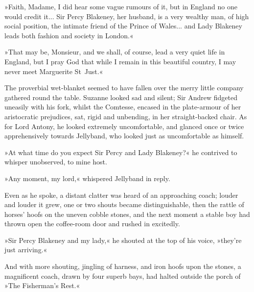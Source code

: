 »Faith, Madame, I did hear some vague rumours of it, but in England no one would credit it... Sir Percy Blakeney, her husband, is a very wealthy man, of high social position, the intimate friend of the Prince of Wales... and Lady Blakeney leads both fashion and society in London.«

»That may be, Monsieur, and we shall, of course, lead a very quiet life in England, but I pray God that while I remain in this beautiful country, I may never meet Marguerite St~Just.«

The proverbial wet-blanket seemed to have fallen over the merry little company gathered round the table. Suzanne looked sad and silent; Sir Andrew fidgeted uneasily with his fork, whilst the Comtesse, encased in the plate-armour of her aristocratic prejudices, sat, rigid and unbending, in her straight-backed chair. As for Lord Antony, he looked extremely uncomfortable, and glanced once or twice apprehensively towards Jellyband, who looked just as uncomfortable as himself.

»At what time do you expect Sir Percy and Lady Blakeney?« he contrived to whisper unobserved, to mine host.

»Any moment, my lord,« whispered Jellyband in reply.

Even as he spoke, a distant clatter was heard of an approaching coach; louder and louder it grew, one or two shouts became distinguishable, then the rattle of horses' hoofs on the uneven cobble stones, and the next moment a stable boy had thrown open the coffee-room door and rushed in excitedly.

»Sir Percy Blakeney and my lady,« he shouted at the top of his voice, »they're just arriving.«

And with more shouting, jingling of harness, and iron hoofs upon the stones, a magnificent coach, drawn by four superb bays, had halted outside the porch of »The Fisherman's Rest.«
